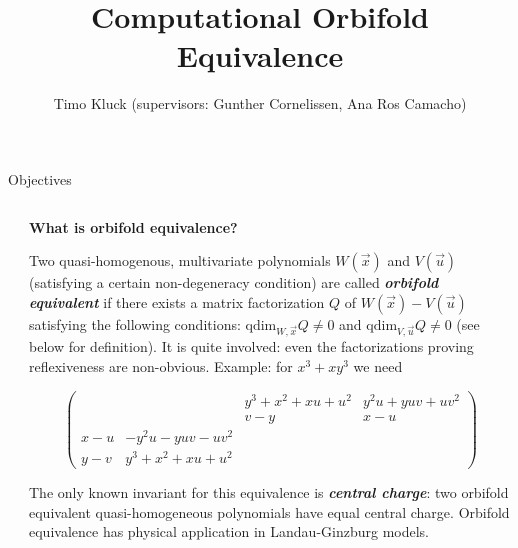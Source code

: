 \documentclass[final]{beamer}
\title{Computational Orbifold Equivalence} %
\author{Timo Kluck (supervisors: Gunther Cornelissen, Ana Ros Camacho)} %
\institute{Utrecht University} %
\newlength{\sepwid}
\newlength{\smallercolwid}
\begin{document}

\setlength{\belowcaptionskip}{2ex} %
\setlength\belowdisplayshortskip{2ex} %

\begin{frame}[t] %

\begin{alertblock}{Objectives}

\begin{columns}

\begin{column}{\sepwid}\end{column} %

\begin{column}{\smallercolwid} %

\justify

\textbf{\large{}What is orbifold equivalence?}{\large \par}

Two quasi-homogenous, multivariate polynomials $W(\vec{x})$
and $V(\vec{u})$ (satisfying a certain non-degeneracy
condition) are called \textbf{\emph{orbifold equivalent}} if there
exists a matrix factorization $Q$ of $W(\vec{x})-V(\vec{u})$
satisfying the following conditions: $\mathrm{qdim}_{W,\vec{x}}Q\neq0$
and $\mathrm{qdim}_{V,\vec{u}}Q\neq0$ (see below for definition).
It is quite involved: even the factorizations proving reflexiveness
are non-obvious. Example: for $x^{3}+xy^{3}$ we need

\[
\left(\begin{array}{cccc}
 &  & y^{3}+x^{2}+xu+u^{2} & y^{2}u+yuv+uv^{2}\\
 &  & v-y & x-u\\
x-u & -y^{2}u-yuv-uv^{2}\\
y-v & y^{3}+x^{2}+xu+u^{2}
\end{array}\right)
\]

The only known invariant for this equivalence is \textbf{\emph{central
charge}}: two orbifold equivalent quasi-homogeneous polynomials have
equal central charge.
Orbifold equivalence has physical application in Landau-Ginzburg models.

\bigskip


\end{column}
\end{columns}
\end{alertblock}
\end{frame}
\end{document}
